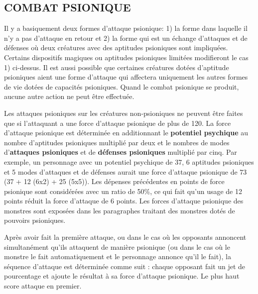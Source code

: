 \documentclass[12pt]{article}
\begin{document}
{\subsection*{\normalsize COMBAT PSIONIQUE}

Il y a basiquement deux formes d'attaque psionique: 1) la forme dans laquelle il n'y a pas d'attaque en retour et 2) la forme qui est un échange d'attaques et de défenses où deux créatures avec des aptitudes psioniques sont impliquées. Certains dispositifs magiques ou aptitudes psioniques limitées modifieront le cas 1) ci-dessus. Il est aussi possible que certaines créatures dotées d'aptitude psioniques aient une forme d'attaque qui affectera uniquement les autres formes de vie dotées de capacités psioniques. Quand le combat psionique se produit, aucune autre action ne peut être effectuée.

\medskip

Les attaques psioniques sur les créatures non-psioniques ne peuvent être faites que si l'attaquant a une force d'attaque psionique de plus de 120. La force d'attaque psionique est déterminée en additionnant le \textbf{potentiel psychique} au nombre d'aptitudes psioniques multiplié par deux et le nombres de modes d'\textbf{attaques psioniques} et de \textbf{défenses psioniques} multiplié par cinq. Par exemple, un personnage avec un potentiel psychique de 37, 6 aptitudes psioniques et 5 modes d'attaques et de défenses aurait une force d'attaque psionique de 73 (37 + 12 (6x2) + 25 (5x5)). Les dépenses précédentes en points de force psionique sont considérées avec un ratio de 50\%, ce qui fait qu'un usage de 12 points réduit la force d'attaque de 6 points. Les forces d'attaque psionique des monstres sont exposées dans les paragraphes traitant des monstres dotés de pouvoirs psioniques.

\medskip

Après avoir fait la première attaque, ou dans le cas où les opposants annoncent simultanément qu'ils attaquent de manière psionique (ou dans le cas où le monstre le fait automatiquement et le personnage annonce qu'il le fait), la séquence d'attaque est déterminée comme suit : chaque opposant fait un jet de pourcentage et ajoute le résultat à sa force d'attaque psionique. Le plus haut score attaque en premier.

\bigskip

}
\end{document}
